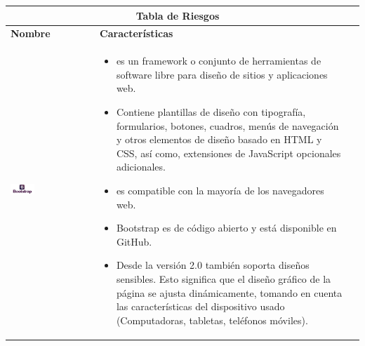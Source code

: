 	\begin{table}[b!]
    \centering
      \begin{tabular}{|p{1cm}|ll}
        \hline
        \multicolumn{2}{|c|}{{\bf Tabla de Riesgos}} \\ 
        \hline
          \multicolumn{1}{|p{4cm}|}{{\bf Nombre}} & 
		  \multicolumn{1}{p{10cm}|}{{\bf Características}}\\

        \hline
          \multicolumn{1}{|p{5cm}|}{\includegraphics[width=0.3\textwidth]{images/bootstrap}} & 
          \multicolumn{1}{p{10cm}|}{\begin{itemize}
          \item es un framework o conjunto de herramientas de software libre para diseño de sitios y aplicaciones web. 
        \item Contiene plantillas de diseño con tipografía, formularios, botones, cuadros, menús de navegación y otros elementos de diseño basado en HTML y CSS, así como, extensiones de JavaScript opcionales adicionales.
        \item es compatible con la mayoría de los navegadores web.
        \item Bootstrap es de código abierto y está disponible en GitHub. 
        \item Desde la versión 2.0 también soporta diseños sensibles. Esto significa que el diseño gráfico de la página se ajusta dinámicamente, tomando en cuenta las características del dispositivo usado (Computadoras, tabletas, teléfonos móviles).
      \end{itemize}} \\
         

\end{tabular}
\end{table}
